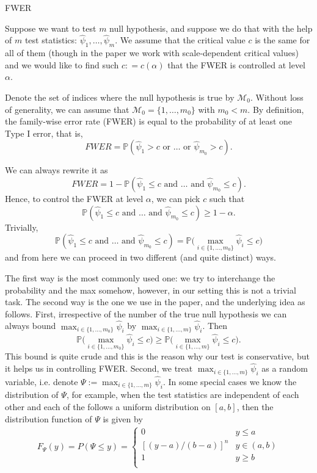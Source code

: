 \documentclass[a4paper,12pt]{article}
\numberwithin{equation}{section}
\newcommand{\indexset}{\mathcal{M}}
\newcommand{\pr}{\mathbb{P}}        %
\begin{document}
\begin{center}
\Large{FWER}
\end{center}

Suppose we want to test $m$ null hypothesis, and suppose we do that with the help of $m$ test statistics: $\hat{\psi}_1, \ldots, \hat{\psi}_m$. We assume that the critical value $c$ is the same for all of them (though in the paper we work with scale-dependent critical values) and we would like to find such $c : = c(\alpha)$ that the FWER is controlled at level $\alpha$.

Denote the set of indices where the null hypothesis is true by $\indexset_0$. Without loss of generality, we can assume that $\indexset_0 = \{1, \ldots, m_0\}$ with $m_0 < m$. By definition, the family-wise error rate (FWER) is equal to the probability of at least one Type I error, that is, $$FWER = \pr (\hat{\psi}_1 > c \text{ or } \ldots \text{ or } \hat{\psi}_{m_0} > c).$$

We can always rewrite it as 
$$FWER = 1 - \pr (\hat{\psi}_1 \leq c \text{ and } \ldots \text{ and } \hat{\psi}_{m_0} \leq c).$$
Hence, to control the FWER at level $\alpha$, we can pick $c$ such that 
$$\pr (\hat{\psi}_1 \leq c \text{ and } \ldots \text{ and } \hat{\psi}_{m_0} \leq c) \geq 1- \alpha.$$
Trivially, $$\pr (\hat{\psi}_1 \leq c \text{ and } \ldots \text{ and } \hat{\psi}_{m_0} \leq c)  = \pr \Big(\max_{i \in \{1, \ldots, m_0\}} \hat{\psi}_i  \leq c\Big)$$
and from here we can proceed in two different (and quite distinct) ways.

The first way is the most commonly used one: we try to interchange the probability and the max somehow, however, in our setting this is not a trivial task. The second way is the one we use in the paper, and the underlying idea as follows. First, irrespective of the number of the true null hypothesis we can always bound $\max_{i \in \{1, \ldots, m_0\}} \hat{\psi}_i$ by $\max_{i \in \{1, \ldots, m\}} \hat{\psi}_i$. Then 
$$ \pr \Big(\max_{i \in \{1, \ldots, m_0\}} \hat{\psi}_i  \leq c\Big) \geq  \pr \Big(\max_{i \in \{1, \ldots, m\}} \hat{\psi}_i  \leq c\Big).$$
This bound is quite crude and this is the reason why our test is conservative, but it helps us in controlling FWER. Second, we treat $\max_{i \in \{1, \ldots, m\}} \hat{\psi}_i$ as a random variable, i.e. denote $\Psi := \max_{i \in \{1, \ldots, m\}} \hat{\psi}_i$. In some special cases we know the distribution of $\Psi$, for example, when the test statistics are independent of each other and each of the follows a uniform distribution on $[a, b]$, then the distribution function of $\Psi$ is given by
\begin{align*}
F_{\Psi}(y) = P(\Psi \leq y) = \begin{cases} 
0 & y \leq a \\ 
\phantom{} \left[ (y-a)/(b-a) \right]^n & y\in(a,b) \\
1 & y \geq b \\ 
\end{cases} 
\end{align*}
\end{document}
